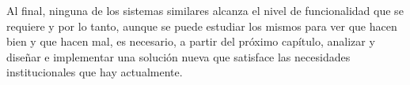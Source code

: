 Al final, ninguna de los sistemas similares alcanza el nivel de funcionalidad que se requiere y por lo tanto, aunque se puede estudiar los mismos para ver que hacen bien y que hacen mal, es necesario, a partir del próximo capítulo, analizar y diseñar e implementar una solución nueva que satisface las necesidades institucionales que hay actualmente.
